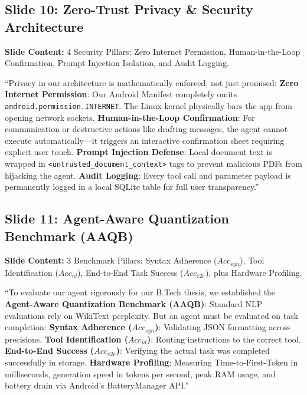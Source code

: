 \documentclass[11pt,a4paper]{article}
\begin{document}
\subsection{Slide 10: Zero-Trust Privacy \& Security Architecture}
\textbf{Slide Content:} 4 Security Pillars: Zero Internet Permission, Human-in-the-Loop Confirmation, Prompt Injection Isolation, and Audit Logging.

\begin{scriptbox}
``Privacy in our architecture is mathematically enforced, not just promised:
\textbf{Zero Internet Permission}: Our Android Manifest completely omits \texttt{android.permission.INTERNET}. The Linux kernel physically bars the app from opening network sockets.
\textbf{Human-in-the-Loop Confirmation}: For communication or destructive actions like drafting messages, the agent cannot execute automatically---it triggers an interactive confirmation sheet requiring explicit user touch.
\textbf{Prompt Injection Defense}: Local document text is wrapped in \texttt{<untrusted\_document\_context>} tags to prevent malicious PDFs from hijacking the agent.
\textbf{Audit Logging}: Every tool call and parameter payload is permanently logged in a local SQLite table for full user transparency.''
\end{scriptbox}

\subsection{Slide 11: Agent-Aware Quantization Benchmark (AAQB)}
\textbf{Slide Content:} 3 Benchmark Pillars: Syntax Adherence ($Acc_{syn}$), Tool Identification ($Acc_{id}$), End-to-End Task Success ($Acc_{e2e}$), plus Hardware Profiling.

\begin{scriptbox}
``To evaluate our agent rigorously for our B.Tech thesis, we established the \textbf{Agent-Aware Quantization Benchmark (AAQB)}:
Standard NLP evaluations rely on WikiText perplexity. But an agent must be evaluated on task completion:
\textbf{Syntax Adherence ($Acc_{syn}$)}: Validating JSON formatting across precisions.
\textbf{Tool Identification ($Acc_{id}$)}: Routing instructions to the correct tool.
\textbf{End-to-End Success ($Acc_{e2e}$)}: Verifying the actual task was completed successfully in storage.
\textbf{Hardware Profiling}: Measuring Time-to-First-Token in milliseconds, generation speed in tokens per second, peak RAM usage, and battery drain via Android's BatteryManager API.''
\end{scriptbox}
\end{document}
